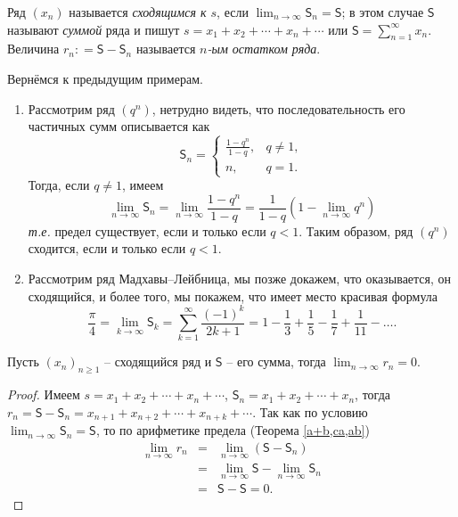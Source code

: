 \begin{definition}
    Ряд $(x_n)$ называется \textit{сходящимся к $s$}, если $\lim_{n \to \infty}\mathsf{S}_n = \mathsf{S}$; в этом случае $\mathsf{S}$ называют \textit{суммой} ряда и пишут $s = x_1 + x_2+\cdots + x_n + \cdots$ или $\mathsf{S} = \sum_{n=1}^\infty x_n$. Величина $r_n: = \mathsf{S}-\mathsf{S}_n$ называется \textit{$n$-ым остатком ряда}.
\end{definition}

\begin{example}\label{geometric_series_and_ML_series} Вернёмся к предыдущим примерам.
    \begin{enumerate}
        \item Рассмотрим ряд $(q^n)$, нетрудно видеть, что последовательность его частичных сумм описывается как
        \[
         \mathsf{S}_n  = \begin{cases}
             \frac{1-q^n}{1-q}, & q \ne 1,\\
             n, & q =1.
         \end{cases}
        \]
Тогда, если $q \ne 1$, имеем
\[
 \lim_{n \to \infty} \mathsf{S}_n = \lim_{n \to \infty} \frac{1-q^n}{1-q} = \frac{1}{1-q} \left( 1- \lim_{n \to \infty} q^n \right)
\]
\textit{т.е.} предел существует, если и только если $q<1$. Таким образом, ряд $(q^n)$ сходится, если и только если $q<1.$

\item Рассмотрим ряд Мадхавы--Лейбница, мы позже докажем, что оказывается, он сходящийся, и более того, мы покажем, что имеет место красивая формула
\[
 \frac{\pi}{4} = \lim_{k \to \infty} \mathsf{S}_k = \sum_{k=1}^\infty \frac{(-1)^k}{2k+1} = 1-\frac{1}{3} + \frac{1}{5} - \frac{1}{7} + \frac{1}{11}-\ldots.
\]
    \end{enumerate}
\end{example}


\begin{lemma}
    Пусть $(x_n)_{n\ge 1}$ -- сходящийся ряд и $\mathsf{S}$ -- его сумма, тогда $\lim_{n \to \infty }r_n = 0.$
\end{lemma}

\begin{proof}
    Имеем $s = x_1+x_2+\cdots + x_n +\cdots$, $\mathsf{S}_n = x_1 + x_2 + \cdots + x_n$, тогда $r_n = \mathsf{S}-\mathsf{S}_n = x_{n+1}+ x_{n+2} + \cdots + x_{n+k} + \cdots$. Так как по условию $\lim_{n \to \infty} \mathsf{S}_n = \mathsf{S}$, то по арифметике предела (Теорема \ref{a+b,ca,ab})
    \begin{eqnarray*}
     \lim_{n \to \infty} r_n &=& \lim_{n \to \infty}(\mathsf{S}- \mathsf{S}_n) \\
     &=&  \lim_{n \to \infty} \mathsf{S} -  \lim_{n \to \infty} \mathsf{S}_n \\
     &=& \mathsf{S}- \mathsf{S} = 0.
    \end{eqnarray*}
\end{proof}



